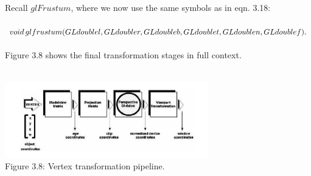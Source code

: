 \documentclass[
11pt, %
english, %
singlespacing, %
headsepline, %
]{MastersDoctoralThesis} %
\begin{document}
Recall $glFrustum$, where we now use the same symbols as in eqn. 3.18:\\ \\
$void \, glfrustum(GLdouble l, GLdouble r, GLdouble b, GLdouble t, GLdouble n, \\ GLdouble f).$\\ \\
Figure 3.8 shows the final transformation stages in full context.
\\ \\
\begin{center}
\includegraphics[width=250pt]{3-8}
\\ Figure 3.8: Vertex transformation pipeline. \\
\end{center} 
\end{document}
